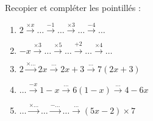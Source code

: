 
\begin{exercice}\label{exosmath-0982}

    Recopier et compléter les pointillés :
    \begin{enumerate}
        \item
        $2\stackrel{\times x}{\longrightarrow}\ldots\stackrel{-1}{\longrightarrow}\ldots\stackrel{\times 3}{\longrightarrow}\ldots\stackrel{-4}{\longrightarrow}\ldots$
    \item
        \( -x\stackrel{\times 3}{\longrightarrow}\ldots\stackrel{\times 5}{\longrightarrow}\ldots\stackrel{+2}{\longrightarrow}  \ldots\stackrel{\times 4}{\longrightarrow}\ldots\)
    \item
        \( 2\stackrel{ \times \ldots }{\longrightarrow}2x\stackrel{\ldots}{\longrightarrow}2x+3\stackrel{\ldots}{\longrightarrow}  7(2x+3)\)
    \item
        \( \ldots\stackrel{ -x }{\longrightarrow}1-x\stackrel{\ldots}{\longrightarrow}6(1-x)\stackrel{\ldots}{\longrightarrow}  4-6x\)
    \item
        \( \ldots\stackrel{ \times\ldots }{\longrightarrow}\ldots\stackrel{-\ldots}{\longrightarrow}\ldots\stackrel{\ldots}{\longrightarrow}  (5x-2)\times 7\)
    \end{enumerate}
\end{exercice}
